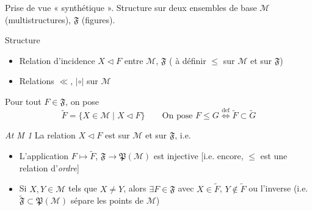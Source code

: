 \documentclass[11pt,a4paper]{article}
\begin{document}
Prise de vue « synthétique ». Structure sur deux ensembles de base
$\mathcal{M}$ (multistructures), $\mathfrak{F}$ (figures).

Structure
\begin{itemize}
  \item[a)] Relation d'incidence $X \lhd F$ entre $\mathcal{M}$, $\mathfrak{F}$
    ( à définir $\leq$ sur $\mathcal{M}$ et sur $\mathfrak{F}$)
  \item[b)] Relations $\ll$, $|\circ|$ sur $\mathcal{M}$
\end{itemize}

Pour tout $F \in \mathfrak{F}$, on pose
\[
  \widetilde{F} = \{ X \in \mathcal{M} \mid X \lhd F \}
  \qquad \text{On pose } F \leq G \overset{\mathrm{def}}{\Longleftrightarrow}
  \widetilde{F} \subset \widetilde{G}
\]



\emph{At M 1}  La relation $X \lhd F$ est  sur
$\mathcal{M}$ et sur $\mathfrak{F}$, i.e.
\begin{itemize}
  \item[a)] L'application $F \longmapsto \widetilde{F}$,
    $\mathfrak{F} \longrightarrow \mathfrak{P}(\mathcal{M})$ est injective
    [i.e. encore, $\leq$ est une relation d'\emph{ordre}]
  \item[b)] Si $X, Y \in \mathcal{M}$ tels que $X \neq Y$, alors
    $\exists F \in \mathfrak{F}$ avec $X \in \widetilde{F}$,
    $Y \notin \widetilde{F}$ ou l'inverse (i.e.
    $\widetilde{\mathfrak{F}} \subset \mathfrak{P}(\mathcal{M})$ sépare les
    points de $\mathcal{M}$)
\end{itemize}
\end{document}
